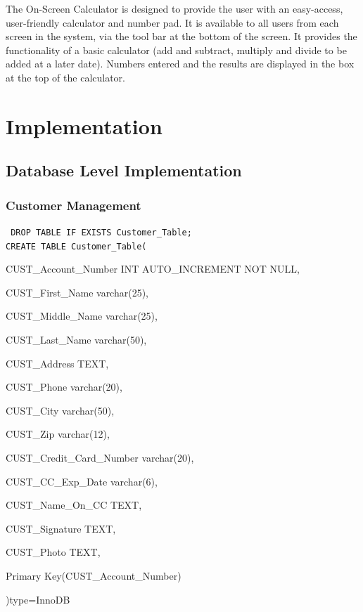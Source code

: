 \documentclass{report}
\begin{document}
    The On-Screen Calculator is designed to provide the user with
    an easy-access, user-friendly calculator and number pad.  It
    is available to all users from each screen in the system, via the tool bar
    at the bottom of the screen.  It provides the functionality of
    a basic calculator (add and subtract, multiply and divide to
    be added at a later date).  Numbers entered and the results
    are displayed in the box at the top of the calculator.\\

\chapter{Implementation}

    \section{Database Level Implementation}


        \subsection{Customer Management}
        {\tt\small
        DROP TABLE IF EXISTS Customer\_Table;\\

        CREATE TABLE Customer\_Table(
        \begin{list}{}
            \item{CUST\_Account\_Number INT AUTO\_INCREMENT NOT NULL,}
            \item{CUST\_First\_Name varchar(25),}
            \item{CUST\_Middle\_Name varchar(25),}
            \item{CUST\_Last\_Name varchar(50),}
            \item{CUST\_Address TEXT,}
            \item{CUST\_Phone varchar(20),}
            \item{CUST\_City varchar(50),}
            \item{CUST\_Zip varchar(12),}
            \item{CUST\_Credit\_Card\_Number varchar(20),}
            \item{CUST\_CC\_Exp\_Date varchar(6),}
            \item{CUST\_Name\_On\_CC TEXT,}
            \item{CUST\_Signature TEXT,}
            \item{CUST\_Photo TEXT,}
            \item{Primary Key(CUST\_Account\_Number)}
        \end{list}
        )type=InnoDB\\
        }
\end{document}
